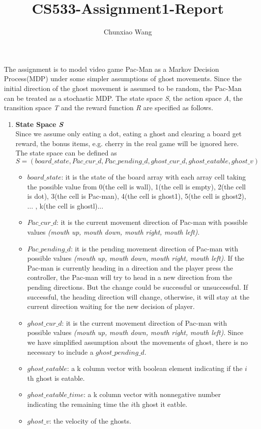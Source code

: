 \documentclass{article}
\begin{document}
\title{CS533-Assignment1-Report}
\author{Chunxiao Wang}
\date{}
\maketitle
The assignment is to model video game Pac-Man as a Markov Decision Process(MDP) under some simpler assumptions of ghost movements. Since the initial direction of the ghost movement is assumed to be random, the Pac-Man can be treated as a stochastic MDP. The state space \textit{S}, the action space \textit{A}, the transition space \textit{T} and the reward function \textit{R} are specified as follows.

\begin{enumerate}
\item\textbf{State Space \textit{S}}\\
Since we assume only eating a dot, eating a ghost and clearing a board get reward, the bonus items, e.g. cherry in the real game will be ignored here. The state space can be defined as 
\[
\textit{S} = (board\_state, Pac\_cur\_d, Pac\_pending\_d, ghost\_cur\_d, ghost\_eatable, ghost\_v)
\]
\begin{itemize}
\item $board\_state$: it is the state of the board array with each array cell taking the possible value from 0(the cell is wall), 1(the cell is empty), 2(the cell is dot), 3(the cell is Pac-man), 4(the cell is ghost1), 5(the cell is ghost2), ... , k(the cell is ghostl)...
\item $Pac\_cur\_d$: it is the current movement direction of Pac-man with possible values \textit{(mouth up, mouth down, mouth right, mouth left)}.
\item $Pac\_pending\_d$: it is the pending movement direction of Pac-man with possible values \textit{(mouth up, mouth down, mouth right, mouth left)}. If the Pac-man is currently heading in a direction and the player press the controller, the Pac-man will try to head in a new direction from the pending directions. But the change could be successful or unsuccessful. If successful, the heading direction will change, otherwise, it will stay at the current direction waiting for the new decision of player.
\item $ghost\_cur\_d$: it is the current movement direction of Pac-man with possible values \textit{(mouth up, mouth down, mouth right, mouth left)}. Since we have simplified assumption about the movements of ghost, there is no necessary to include a $ghost\_pending\_d$.
\item $ghost\_eatable$: a k column vector with boolean element indicating if the $i$th ghost is eatable.
\item $ghost\_eatable\_time$: a k column vector with nonnegative number indicating the remaining time the $i$th ghost it eatble.
\item $ghost\_v$: the velocity of the ghosts.
\end{itemize}


\end{enumerate}
\end{document}
